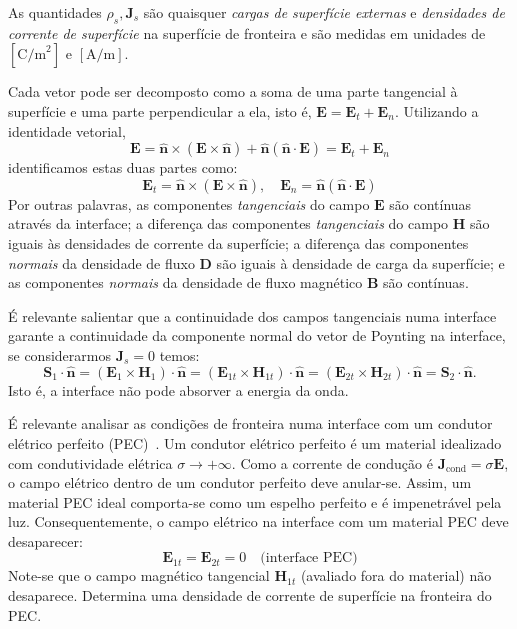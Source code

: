 As quantidades $\rho_s, \mathbf{J}_s$ são quaisquer \textit{cargas de superfície externas} e \textit{densidades de corrente de superfície} na superfície de fronteira e são medidas em unidades de $[\text{C/m}^2]$ e $[\text{A/m}]$.

Cada vetor pode ser decomposto como a soma de uma parte tangencial à superfície e uma parte perpendicular a ela, isto é, $\mathbf{E} = \mathbf{E}_t + \mathbf{E}_n$. Utilizando a identidade vetorial,
$$
    \mathbf{E} = \mathbf{\hat{n}} \times (\mathbf{E} \times \mathbf{\hat{n}}) + \mathbf{\hat{n}}(\mathbf{\hat{n}} \cdot \mathbf{E}) = \mathbf{E}_t + \mathbf{E}_n
$$
identificamos estas duas partes como:
$$
    \mathbf{E}_t = \mathbf{\hat{n}} \times (\mathbf{E} \times \mathbf{\hat{n}}), \quad \mathbf{E}_n = \mathbf{\hat{n}} (\mathbf{\hat{n}} \cdot \mathbf{E})
$$
Por outras palavras, as componentes \textit{tangenciais} do campo $\mathbf{E}$ são contínuas através da interface; a diferença das componentes \textit{tangenciais} do campo $\mathbf{H}$ são iguais às densidades de corrente da superfície; a diferença das componentes \textit{normais} da densidade de fluxo $\mathbf{D}$ são iguais à densidade de carga da superfície; e as componentes \textit{normais} da densidade de fluxo magnético $\mathbf{B}$ são contínuas.

\begin{warning}
    É relevante salientar que a continuidade dos campos tangenciais numa interface garante a continuidade da componente normal do vetor de Poynting na interface, se considerarmos $\mathbf{J}_{s} = 0$ temos:
    $$
        \mathbf{S}_1 \cdot \mathbf{\hat{n}} = (\mathbf{E}_1 \times \mathbf{H}_1) \cdot \mathbf{\hat{n}} = (\mathbf{E}_{1t} \times \mathbf{H}_{1t}) \cdot \mathbf{\hat{n}} = (\mathbf{E}_{2t} \times \mathbf{H}_{2t}) \cdot \mathbf{\hat{n}} = \mathbf{S}_2 \cdot \mathbf{\hat{n}}.
    $$
    Isto é, a interface não pode absorver a energia da onda.
\end{warning}

\begin{warning}
    É relevante analisar as condições de fronteira numa interface com um condutor elétrico perfeito (PEC)~\cite{silveirinha2023}. Um condutor elétrico perfeito é um material idealizado com condutividade elétrica $\sigma \to +\infty$. Como a corrente de condução é $\mathbf{J}_{\text{cond}} = \sigma \mathbf{E}$, o campo elétrico dentro de um condutor perfeito deve anular-se. Assim, um material PEC ideal comporta-se como um espelho perfeito e é impenetrável pela luz. Consequentemente, o campo elétrico na interface com um material PEC deve desaparecer:
    $$
        \mathbf{E}_{1t} = \mathbf{E}_{2t} = 0
        \quad \text{(interface PEC)}
    $$
    Note-se que o campo magnético tangencial $\mathbf{H}_{1t}$ (avaliado fora do material) não desaparece. Determina uma densidade de corrente de superfície na fronteira do PEC.
\end{warning}

